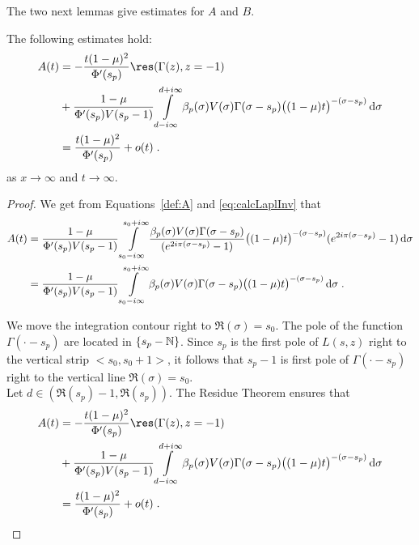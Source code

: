 The two next lemmas give estimates for $A$ and $B$. 

\begin{lemma} The following estimates hold: 
    \begin{align*}
        A(t) 
        &=  - \frac{t(1-\mu)^2}{\Phi'(s_p)} \res(\Gamma(z), z = -1) \\
        &+   \frac{1-\mu}{\Phi'(s_p) V(s_p-1)}
         \int\limits_{d-i\infty}^{d+i\infty}
         \beta_p(\sigma) V(\sigma)
       \Gamma(\sigma-s_p)\big((1-\mu)t\big)^{-(\sigma-s_p)} \diff \sigma \\
       &=  \frac{t(1-\mu)^2}{\Phi'(s_p)} + o(t)
      \eqfinp
    \end{align*}
    as $x \to \infty$ and $t \to \infty$.
\end{lemma}
\begin{proof}We get from Equations~\eqref{def:A} and \eqref{eq:calcLaplInv} that 
\begin{subequations}
    \begin{align}
    A(t) 
    &=
    \frac{1-\mu}{\Phi'(s_p) V(s_p-1)}
     \int\limits_{s_0-i\infty}^{s_0+i\infty}
     \frac{\beta_p(\sigma) V(\sigma)\Gamma(\sigma-s_p)
  }{(e^{2i\pi(\sigma-s_p)}-1)} \big((1-\mu)t\big)^{-(\sigma-s_p)}(e^{2i\pi(\sigma-s_p)}-1) \,\mathrm{d} \sigma  \\
  &=  
   \frac{1-\mu}{\Phi'(s_p) V(s_p-1)}
     \int\limits_{s_0-i\infty}^{s_0+i\infty}
     \beta_p(\sigma) V(\sigma)
   \Gamma(\sigma-s_p)\big((1-\mu)t\big)^{-(\sigma-s_p)} \,\mathrm{d} \sigma
  \; .
\end{align}
\end{subequations}

We move the integration contour right to $\Re(\sigma) = s_0$. The pole of the function $\Gamma(\cdot-s_p)$ are located in $\{s_p - \mathbb{N}\}$. Since $s_p$ is the first pole of $L(s,z)$ right to the vertical strip $<s_0, s_0+1>$, it follows that $s_p-1$ is first pole of $\Gamma(\cdot-s_p)$ right to the vertical line $\Re(\sigma) = s_0$. \\

Let $d \in (\Re(s_p)-1,\Re(s_p))$. The Residue Theorem ensures that 
\begin{align*}
    A(t) 
    &=  - \frac{t(1-\mu)^2}{\Phi'(s_p)} \res(\Gamma(z), z = -1) \\
    & +   \frac{1-\mu}{\Phi'(s_p) V(s_p-1)}
     \int\limits_{d-i\infty}^{d+i\infty}
     \beta_p(\sigma) V(\sigma)
   \Gamma(\sigma-s_p)\big((1-\mu)t\big)^{-(\sigma-s_p)} \diff \sigma \\
   &=  \frac{t(1-\mu)^2}{\Phi'(s_p)} + o(t)
  \eqfinp
\end{align*}
\end{proof}

